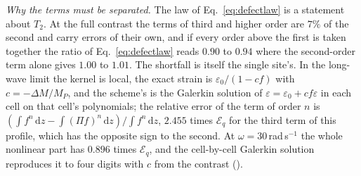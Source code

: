 \documentclass[preprint,review,12pt]{elsarticle}
\newcommand{\dd}{\mathrm{d}}
\begin{document}
\emph{Why the terms must be separated.} The law of Eq.~\eqref{eq:defectlaw} is a statement about $T_2$. At the full contrast
the terms of third and higher order are $7\%$ of the second and carry errors of their own, and if every
order above the first is taken together the ratio of Eq.~\eqref{eq:defectlaw} reads $0.90$ to $0.94$
where the second-order term alone gives $1.00$ to $1.01$. The shortfall is itself the single site's. In
the long-wave limit the kernel is local, the exact strain is $\varepsilon_0/(1-cf)$ with
$c=-\Delta M/M_P$, and the scheme's is the Galerkin solution of $\varepsilon=\varepsilon_0+cf\varepsilon$
in each cell on that cell's polynomials; the relative error of the term of order $n$ is
$(\int f^n\,\dd z-\int(\Pi f)^n\,\dd z)/\int f^n\,\dd z$, $2.455$ times $\mathcal{E}_q$ for the third term of this profile,
which has the opposite sign to the second. At $\omega=30$\,rad\,s$^{-1}$ the whole nonlinear part has
$0.896$ times $\mathcal{E}_q$, and the cell-by-cell Galerkin solution reproduces it to four digits with
$c$ from the contrast ().
\end{document}
